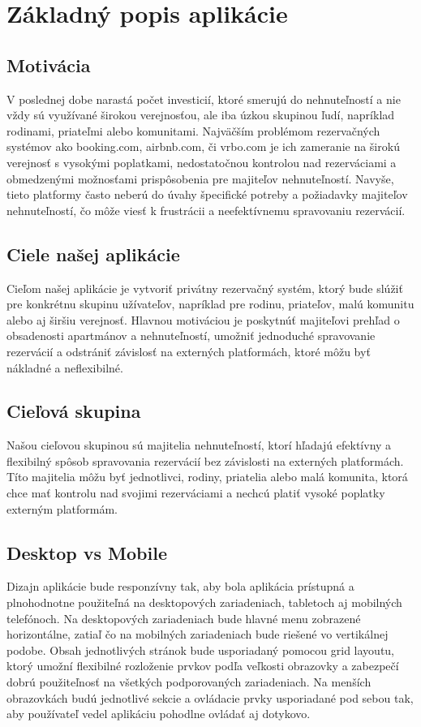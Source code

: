 \section{Základný popis aplikácie}

\subsection{Motivácia}
V poslednej dobe narastá počet investicií, ktoré smerujú do nehnuteľností a nie vždy sú využívané širokou verejnosťou, ale iba úzkou skupinou ľudí, napríklad rodinami, priateľmi alebo komunitami.
Najväčším problémom rezervačných systémov ako booking.com, airbnb.com, či vrbo.com je ich zameranie na širokú verejnosť s vysokými poplatkami, nedostatočnou kontrolou nad rezerváciami a obmedzenými možnosťami prispôsobenia pre majiteľov nehnuteľností. 
Navyše, tieto platformy často neberú do úvahy špecifické potreby a požiadavky majiteľov nehnuteľností, čo môže viesť k frustrácii a neefektívnemu spravovaniu rezervácií.

\subsection{Ciele našej aplikácie}
Cieľom našej aplikácie je vytvoriť privátny rezervačný systém, ktorý bude slúžiť pre konkrétnu skupinu užívateľov, napríklad pre rodinu, priateľov, malú komunitu alebo aj širšiu verejnosť.
Hlavnou motiváciou je poskytnúť majiteľovi prehľad o obsadenosti apartmánov a nehnuteľností, umožniť jednoduché spravovanie rezervácií a odstrániť závislosť na externých platformách, ktoré môžu byť nákladné a neflexibilné.

\subsection{Cieľová skupina}
Našou cieľovou skupinou sú majitelia nehnuteľností, ktorí hľadajú efektívny a flexibilný spôsob spravovania rezervácií bez závislosti na externých platformách. 
Títo majitelia môžu byť jednotlivci, rodiny, priatelia alebo malá komunita, ktorá chce mať kontrolu nad svojimi rezerváciami a nechcú platiť vysoké poplatky externým platformám.

\subsection{Desktop vs Mobile}
Dizajn aplikácie bude responzívny tak, aby bola aplikácia prístupná a plnohodnotne použiteľná na desktopových zariadeniach, tabletoch aj mobilných telefónoch.
Na desktopových zariadeniach bude hlavné menu zobrazené horizontálne, zatiaľ čo na mobilných zariadeniach bude riešené vo vertikálnej podobe.
Obsah jednotlivých stránok bude usporiadaný pomocou grid layoutu, ktorý umožní flexibilné rozloženie prvkov podľa veľkosti obrazovky a zabezpečí dobrú použiteľnosť na všetkých podporovaných zariadeniach.
Na menších obrazovkách budú jednotlivé sekcie a ovládacie prvky usporiadané pod sebou tak, aby používateľ vedel aplikáciu pohodlne ovládať aj dotykovo.